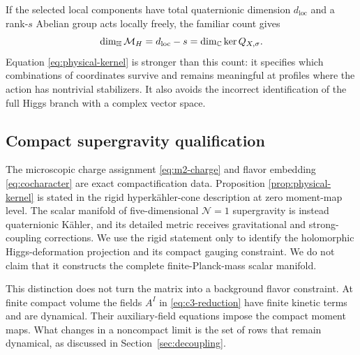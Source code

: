 If the selected local components have total quaternionic dimension
$d_{\mathrm{loc}}$ and a rank-$s$ Abelian group acts locally freely, the
familiar count gives
\begin{equation}
 \dim_{\mathbb H}\mathcal M_H=d_{\mathrm{loc}}-s
 =\dim_{\mathbb C}\ker Q_{X,\sigma}.
 \label{eq:dimension-check}
\end{equation}
Equation \eqref{eq:physical-kernel} is stronger than this count: it specifies
which combinations of coordinates survive and remains meaningful at profiles
where the action has nontrivial stabilizers. It also avoids the incorrect
identification of the full Higgs branch with a complex vector space.

\subsection{Compact supergravity qualification}
\label{subsec:supergravity-qualification}

The microscopic charge assignment \eqref{eq:m2-charge} and flavor embedding
\eqref{eq:cocharacter} are exact compactification data. Proposition
\ref{prop:physical-kernel} is stated in the rigid hyperk\"ahler-cone
description at zero moment-map level. The scalar manifold of five-dimensional
$\mathcal N=1$ supergravity is instead quaternionic K\"ahler, and its detailed
metric receives gravitational and strong-coupling corrections. We use the
rigid statement only to identify the holomorphic Higgs-deformation projection
and its compact gauging constraint. We do not claim that it constructs the
complete finite-Planck-mass scalar manifold.

This distinction does not turn the matrix into a background flavor constraint.
At finite compact volume the fields $A^I$ in \eqref{eq:c3-reduction} have
finite kinetic terms and are dynamical. Their auxiliary-field equations impose
the compact moment maps. What changes in a noncompact limit is the set of rows
that remain dynamical, as discussed in Section~\ref{sec:decoupling}.
